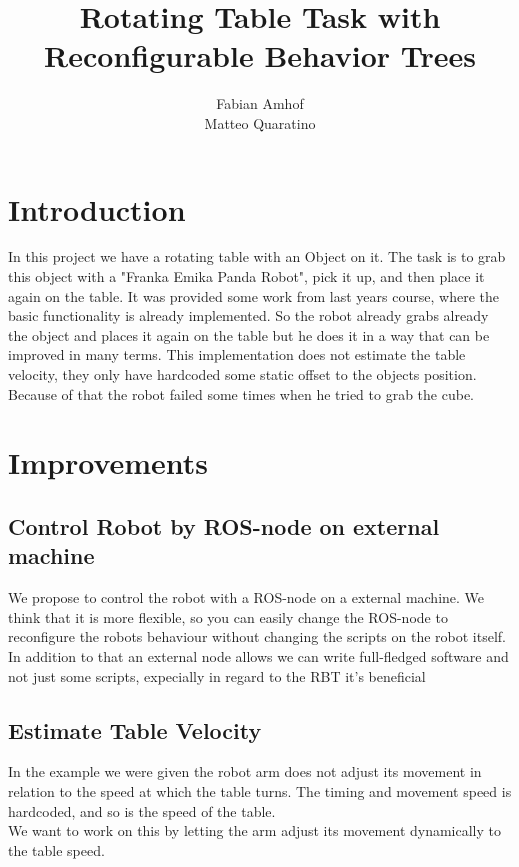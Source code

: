 \documentclass[report]{iisthesis}
\title{Rotating Table Task with Reconfigurable Behavior Trees}
\author{Fabian Amhof \\ Matteo Quaratino}
\begin{document}
\maketitle
\tableofcontents
\label{chap:declare}

\chapter{Introduction}
In this project we have a rotating table with an Object on it. The task is to grab this object with a "Franka Emika Panda Robot", pick it up, and then place it again on the table. It was provided some work from last years course, where the basic functionality is already implemented. So the robot already grabs already the object and places it again on the table but he does it in a way that can be improved in many terms.
This implementation does not estimate the table velocity, they only have hardcoded some static offset to the objects position. Because of that the robot failed some times when he tried to grab the cube. 

\chapter{Improvements}
\label{improvements}

\section{Control Robot by ROS-node on external machine}
\label{separate_node}
We propose to control the robot with a ROS-node on a external machine. 
We think that it is more flexible, so you can easily change the ROS-node to reconfigure the robots behaviour without changing the scripts on the robot itself. In addition to that an external node allows we can write full-fledged software and not just
some scripts, expecially in regard to the RBT it's beneficial

\section{Estimate Table Velocity}
\label{estimate_velocity}
In the example we were given the robot arm does not adjust its movement in relation to the speed at which the table 
turns. The timing and movement speed is hardcoded, and so is the speed of the table. \\
We want to work on this by letting the arm adjust its movement dynamically to the table speed.
\end{document}
